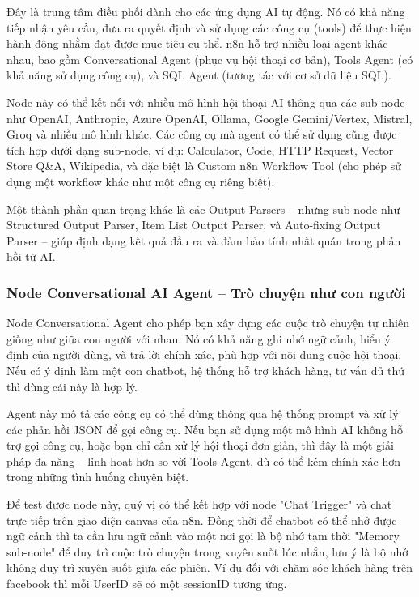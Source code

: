 Đây là trung tâm điều phối dành cho các ứng dụng AI tự động. Nó có khả năng tiếp nhận yêu cầu, đưa ra quyết định và sử dụng các công cụ (tools) để thực hiện hành động nhằm đạt được mục tiêu cụ thể. n8n hỗ trợ nhiều loại agent khác nhau, bao gồm Conversational Agent (phục vụ hội thoại cơ bản), Tools Agent (có khả năng sử dụng công cụ), và SQL Agent (tương tác với cơ sở dữ liệu SQL).


Node này có thể kết nối với nhiều mô hình hội thoại AI thông qua các sub-node như OpenAI, Anthropic, Azure OpenAI, Ollama, Google Gemini/Vertex, Mistral, Groq và nhiều mô hình khác. Các công cụ mà agent có thể sử dụng cũng được tích hợp dưới dạng sub-node, ví dụ: Calculator, Code, HTTP Request, Vector Store Q\&A, Wikipedia, và đặc biệt là Custom n8n Workflow Tool (cho phép sử dụng một workflow khác như một công cụ riêng biệt).

Một thành phần quan trọng khác là các Output Parsers – những sub-node như Structured Output Parser, Item List Output Parser, và Auto-fixing Output Parser – giúp định dạng kết quả đầu ra và đảm bảo tính nhất quán trong phản hồi từ AI.

\subsubsection{Node Conversational AI Agent – Trò chuyện như con người}
Node Conversational Agent cho phép bạn xây dựng các cuộc trò chuyện tự nhiên giống như giữa con người với nhau. Nó có khả năng ghi nhớ ngữ cảnh, hiểu ý định của người dùng, và trả lời chính xác, phù hợp với nội dung cuộc hội thoại. Nếu có ý định làm một con chatbot, hệ thống hỗ trợ khách hàng, tư vấn đủ thứ thì dùng cái này là hợp lý.


Agent này mô tả các công cụ có thể dùng thông qua hệ thống prompt và xử lý các phản hồi JSON để gọi công cụ. Nếu bạn sử dụng một mô hình AI không hỗ trợ gọi công cụ, hoặc bạn chỉ cần xử lý hội thoại đơn giản, thì đây là một giải pháp đa năng – linh hoạt hơn so với Tools Agent, dù có thể kém chính xác hơn trong những tình huống chuyên biệt.

Để test được node này, quý vị có thể kết hợp với node "Chat Trigger" và chat trực tiếp trên giao diện canvas của n8n. Đồng thời để chatbot có thể nhớ được ngữ cảnh thì ta cần lưu ngữ cảnh vào một nơi gọi là bộ nhớ tạm thời "Memory sub-node" để duy trì cuộc trò chuyện trong xuyên suốt lúc nhắn, lưu ý là bộ nhớ không duy trì xuyên suốt giữa các phiên. Ví dụ đối với chăm sóc khách hàng trên facebook thì mỗi UserID sẽ có một sessionID tương ứng. 

